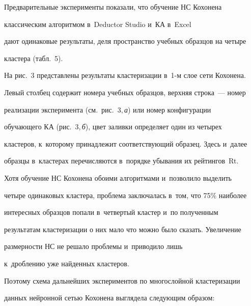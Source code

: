 \begin{description}
  Предварительные эксперименты показали, что обучение НС Кохонена 


классическим алгоритмом в~Deductor Studio и~КА в~Excel 


дают одинаковые результаты, деля пространство учебных образцов на четыре 


кластера (табл.~5).


  





  


  На рис.~3 представлены результаты кластеризации в~1-м слое сети Кохонена.








  Левый столбец содержит номера учебных образцов, верхняя строка~--- номер 


реализации эксперимента (см.\ рис.~3,\,\textit{а}) или номер конфигурации 


обуча\-юще\-го КА (рис.~3,\,\textit{б}), цвет заливки определяет один из четырех 


кластеров, к~которому принадлежит соответствующий образец. Здесь и~далее 


образцы в~кластерах перечисляются в~порядке убывания их рейтингов~Rt.


  


  Хотя обучение НС Кохонена обоими алгоритмами и~позволило выделить 


четыре одинаковых кластера, проблема заключалась в~том, что 75\% наиболее 


интересных образцов попали в~четвертый кластер и~по полученным 


результатам кластеризации о них мало что можно было сказать. Увеличение 


размерности НС не решало проблемы и~приводило лишь 


к~дроблению уже найденных кластеров.




  Поэтому схема дальнейших экспериментов по многослойной кластеризации 


данных нейронной сетью Кохонена выглядела следующим образом:








\begin{figure} %



\end{figure}
\end{description}
